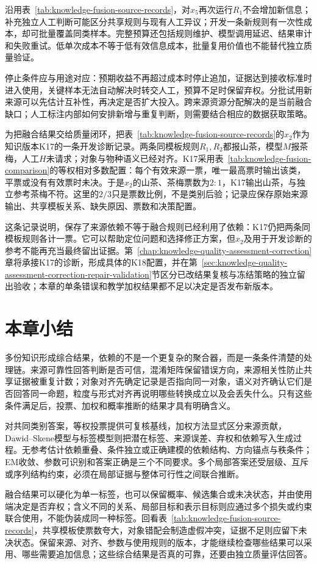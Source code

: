 沿用表~\ref{tab:knowledge-fusion-source-records}，对$x_5$再次运行$R_1$不会增加新信息；补充独立人工判断可能区分共享规则与现有人工异议；开发一条新规则有一次性成本，却可批量覆盖同类样本。完整预算还包括规则维护、模型调用延迟、结果审计和失败重试。低单次成本不等于低有效信息成本，批量复用价值也不能替代独立质量验证。

停止条件应与用途对应：预期收益不再超过成本时停止追加，证据达到接收标准时进入使用，关键样本无法自动解决时转交人工，预算不足时保留弃权。分批试用新来源可以先估计互补性，再决定是否扩大投入。跨来源资源分配解决的是当前融合缺口；人工标注内部如何安排新增与重复判断，则需要结合相应的数据获取策略。

为把融合结果交给质量闭环，把表~\ref{tab:knowledge-fusion-source-records}的$x_2$作为知识版本K17的一条开发诊断记录。两条同模板规则$R_1,R_2$都报山茶，模型$M$报茶梅，人工$H$未请求；对象与物种语义已经对齐。K17采用表~\ref{tab:knowledge-fusion-comparison}的等权相对多数配置：每个有效来源一票，唯一最高票时输出该类，平票或没有有效票时未决。于是$x_2$的山茶、茶梅票数为$2:1$，K17输出山茶，与独立参考茶梅不符。这里的$2/3$只是票数比例，不是类别后验；记录应保存原始来源输出、共享模板关系、缺失原因、票数和决策配置。

这条记录说明，保存了来源依赖不等于融合规则已经利用了依赖：K17仍把两条同模板规则各计一票。它可以帮助定位问题和选择修正方案，但$x_2$及用于开发诊断的参考不能再充当最终留出证据。第~\ref{chap:knowledge-quality-assessment-correction}章将承接K17的诊断，形成具体的K18配置，并在第~\ref{sec:knowledge-quality-assessment-correction-repair-validation}节区分已改结果复核与冻结策略的独立留出验收；本章的单条错误和教学加权结果都不足以决定是否发布新版本。

\section{本章小结}
\label{sec:knowledge-fusion-summary}

多份知识形成综合结果，依赖的不是一个更复杂的聚合器，而是一条条件清楚的处理链。来源可靠性回答判断是否可信，混淆矩阵保留错误方向，来源相关性防止共享证据被重复计数；对象对齐先确定记录是否指向同一对象，语义对齐确认它们是否回答同一命题，粒度与形式对齐再说明哪些转换成立以及会丢失什么。只有这些条件满足后，投票、加权和概率推断的结果才具有明确含义。

对共同类别答案，等权投票提供可复核基线，加权方法显式区分来源贡献，Dawid--Skene模型与标签模型则把潜在标签、来源误差、弃权和依赖写入生成过程。无参考估计依赖重叠、条件独立或正确建模的依赖结构、方向锚点与秩条件；EM收敛、参数可识别和答案正确是三个不同要求。多个局部答案还受层级、互斥或序列结构约束，必须在局部证据与整体可行性之间联合推断。

融合结果可以硬化为单一标签，也可以保留概率、候选集合或未决状态，并由使用端决定是否弃权；含义不同的关系、局部目标和表示目标则应通过多个损失或约束联合使用，不能伪装成同一种标签。回看表~\ref{tab:knowledge-fusion-source-records}，共享模板使票数夸大，对象错配会制造虚假冲突，证据不足则应留下未决状态。保留来源、对齐、参数与使用规则的版本，才能继续检查哪些结果可以采用、哪些需要追加信息；这些综合结果是否真的可靠，还要由独立质量评估回答。
